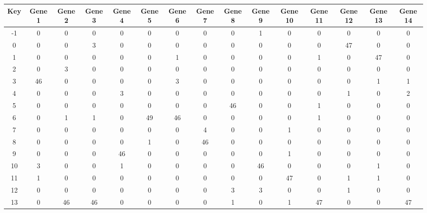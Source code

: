\begin{tabular}{|c|c|c|c|c|c|c|c|c|c|c|c|c|c|c|}
\hline
Key & Gene 1 & Gene 2 & Gene 3 & Gene 4 & Gene 5 & Gene 6 & Gene 7 & Gene 8 & Gene 9 & Gene 10 & Gene 11 & Gene 12 & Gene 13 & Gene 14 \\
\hline
-1 & 0 & 0 & 0 & 0 & 0 & 0 & 0 & 0 & 1 & 0 & 0 & 0 & 0 & 0 \\
0 & 0 & 0 & 3 & 0 & 0 & 0 & 0 & 0 & 0 & 0 & 0 & 47 & 0 & 0 \\
1 & 0 & 0 & 0 & 0 & 0 & 1 & 0 & 0 & 0 & 0 & 1 & 0 & 47 & 0 \\
2 & 0 & 3 & 0 & 0 & 0 & 0 & 0 & 0 & 0 & 0 & 0 & 0 & 0 & 0 \\
3 & 46 & 0 & 0 & 0 & 0 & 3 & 0 & 0 & 0 & 0 & 0 & 0 & 1 & 1 \\
4 & 0 & 0 & 0 & 3 & 0 & 0 & 0 & 0 & 0 & 0 & 0 & 1 & 0 & 2 \\
5 & 0 & 0 & 0 & 0 & 0 & 0 & 0 & 46 & 0 & 0 & 1 & 0 & 0 & 0 \\
6 & 0 & 1 & 1 & 0 & 49 & 46 & 0 & 0 & 0 & 0 & 1 & 0 & 0 & 0 \\
7 & 0 & 0 & 0 & 0 & 0 & 0 & 4 & 0 & 0 & 1 & 0 & 0 & 0 & 0 \\
8 & 0 & 0 & 0 & 0 & 1 & 0 & 46 & 0 & 0 & 0 & 0 & 0 & 0 & 0 \\
9 & 0 & 0 & 0 & 46 & 0 & 0 & 0 & 0 & 0 & 1 & 0 & 0 & 0 & 0 \\
10 & 3 & 0 & 0 & 1 & 0 & 0 & 0 & 0 & 46 & 0 & 0 & 0 & 1 & 0 \\
11 & 1 & 0 & 0 & 0 & 0 & 0 & 0 & 0 & 0 & 47 & 0 & 1 & 1 & 0 \\
12 & 0 & 0 & 0 & 0 & 0 & 0 & 0 & 3 & 3 & 0 & 0 & 1 & 0 & 0 \\
13 & 0 & 46 & 46 & 0 & 0 & 0 & 0 & 1 & 0 & 1 & 47 & 0 & 0 & 47 \\
\hline
\end{tabular}